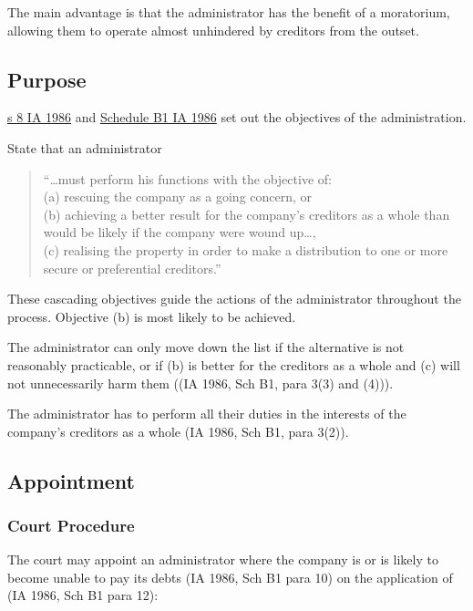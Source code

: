 \documentclass[
]{article}
\begin{document}
The main advantage is that the administrator has the benefit of a
moratorium, allowing them to operate almost unhindered by creditors from
the outset.

\hypertarget{purpose-1}{%
\subsection{Purpose}\label{purpose-1}}

\href{https://www.legislation.gov.uk/ukpga/1986/45/section/8}{s 8 IA
1986} and
\href{https://www.legislation.gov.uk/ukpga/1986/45/schedule/B1}{Schedule
B1 IA 1986} set out the objectives of the administration.

State that an administrator

\begin{quote}
``\ldots must perform his functions with the objective of:\\
(a) rescuing the company as a going concern, or\\
(b) achieving a better result for the company's creditors as a whole
than would be likely if the company were wound up\ldots,\\
(c) realising the property in order to make a distribution to one or
more secure or preferential creditors.''
\end{quote}

These cascading objectives guide the actions of the administrator
throughout the process. Objective (b) is most likely to be achieved.

The administrator can only move down the list if the alternative is not
reasonably practicable, or if (b) is better for the creditors as a whole
and (c) will not unnecessarily harm them ((IA 1986, Sch B1, para 3(3)
and (4))).

The administrator has to perform all their duties in the interests of
the company's creditors as a whole (IA 1986, Sch B1, para 3(2)).

\hypertarget{appointment}{%
\subsection{Appointment}\label{appointment}}

\hypertarget{court-procedure}{%
\subsubsection{Court Procedure}\label{court-procedure}}

The court may appoint an administrator where the company is or is likely
to become unable to pay its debts (IA 1986, Sch B1 para 10) on the
application of (IA 1986, Sch B1 para 12):
\end{document}

